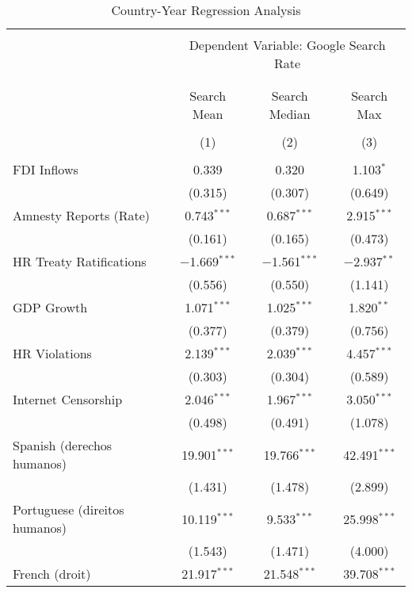 
\begin{table}[!htbp] \centering 
  \caption{Country-Year Regression Analysis} 
  \label{} 
\begin{tabular}{@{\extracolsep{5pt}}lccc} 
\\[-1.8ex]\hline 
\hline \\[-1.8ex] 
 & \multicolumn{3}{c}{Dependent Variable: Google Search Rate} \\ 
\cline{2-4} 
\\[-1.8ex] & \multicolumn{3}{c}{ } \\ 
 & Search Mean & Search Median & Search Max \\ 
\\[-1.8ex] & (1) & (2) & (3)\\ 
\hline \\[-1.8ex] 
 FDI Inflows & 0.339 & 0.320 & 1.103$^{*}$ \\ 
  & (0.315) & (0.307) & (0.649) \\ 
  Amnesty Reports (Rate) & 0.743$^{***}$ & 0.687$^{***}$ & 2.915$^{***}$ \\ 
  & (0.161) & (0.165) & (0.473) \\ 
  HR Treaty Ratifications & $-$1.669$^{***}$ & $-$1.561$^{***}$ & $-$2.937$^{**}$ \\ 
  & (0.556) & (0.550) & (1.141) \\ 
  GDP Growth & 1.071$^{***}$ & 1.025$^{***}$ & 1.820$^{**}$ \\ 
  & (0.377) & (0.379) & (0.756) \\ 
  HR Violations & 2.139$^{***}$ & 2.039$^{***}$ & 4.457$^{***}$ \\ 
  & (0.303) & (0.304) & (0.589) \\ 
  Internet Censorship & 2.046$^{***}$ & 1.967$^{***}$ & 3.050$^{***}$ \\ 
  & (0.498) & (0.491) & (1.078) \\ 
  Spanish (derechos humanos) & 19.901$^{***}$ & 19.766$^{***}$ & 42.491$^{***}$ \\ 
  & (1.431) & (1.478) & (2.899) \\ 
  Portuguese (direitos humanos) & 10.119$^{***}$ & 9.533$^{***}$ & 25.998$^{***}$ \\ 
  & (1.543) & (1.471) & (4.000) \\ 
  French (droit) & 21.917$^{***}$ & 21.548$^{***}$ & 39.708$^{***}$ \\ 

\end{tabular}
\end{table}
